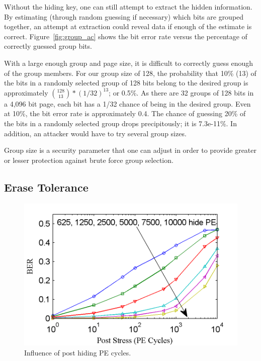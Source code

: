 Without the hiding key, one can still attempt to extract the hidden
information. By estimating (through random guessing if necessary) which 
bits are grouped together,
an attempt at extraction could reveal data if enough of the estimate is
correct. Figure~\ref{fig:group_ac} shows the bit error rate versus the percentage
of correctly guessed group bits. 

With a large enough group and page size, it is difficult to %
correctly guess enough of the group members. For our group size of 128, 
the probability that 
10\% (13) of the bits in a randomly selected group of 128 bits belong
to the desired group is approximately $\binom{128}{13} * (1/32)^{13}$; or 0.5\%.
As there are 32 groups of 128 bits in a 4,096 bit page, each bit has a 1/32 chance of
being in the desired group. Even at 10\%, the bit error rate is approximately
0.4. The chance of guessing 20\% of the bits in a randomly selected group drops
precipitously; it is 7.3e-11\%. In addition, an attacker would have to try
several group sizes.

Group size is a security parameter that one can adjust in order to provide
greater or lesser protection against brute force group selection.


\subsection{Erase Tolerance}

\begin{figure} 
\begin{center} 
\includegraphics[width=\mywidth]{figs/post_pe.png} 
\caption{Influence of post hiding PE cycles.}
\label{fig:postPE} 
\vspace{-0.2in}
\end{center} 
\end{figure} 

